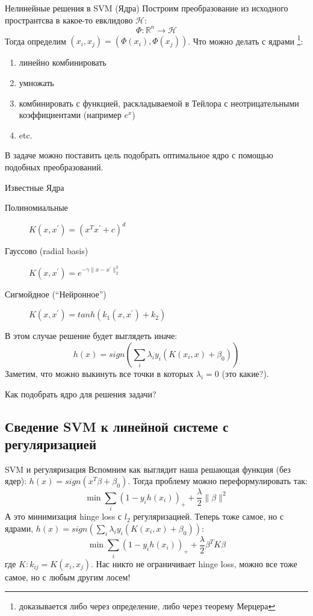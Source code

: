 \documentclass[14pt, fleqn, xcolor={dvipsnames, table}]{beamer}
\begin{document}
\begin{frame}{Нелинейные решения в SVM (Ядра)}
\small
Построим преобразование из исходного пространтсва в какое-то евклидово $\mathcal{H}$:
$$
\Phi: \mathbb{R}^n \to \mathcal{H}
$$
Тогда определим $(x_i, x_j) = (\Phi(x_i), \Phi(x_j))$. Что можно делать с ядрами \footnote{доказывается либо через определение, либо через теорему Мерцера}:
\begin{enumerate}
\footnotesize
  \item линейно комбинировать
  \item умножать
  \item комбинировать с функцией, раскладываемой в Тейлора с неотрицательными коэффициентами (например $e^x$)
  \item etc.
\end{enumerate}
В задаче можно поставить цель подобрать оптимальное ядро с помощью подобных преобразований.
\end{frame}

\begin{frame}{Известные Ядра}
\small
\begin{description}
  \item[Полиномиальные] $K(x,x^{'}) = (x^Tx^{'} + c)^d$ 
  \item[Гауссово (radial basis)] $K(x,x^{'}) = e^{-\gamma \|x - x^{'}\|_2^2}$ 
  \item[Сигмойдное (``Нейронное'')] $K(x,x^{'}) = tanh(k_1 (x,x^{'}) + k_2)$ 
\end{description}
В этом случае решение будет выглядеть иначе:
$$
h(x) = sign \left(\sum_i \lambda_i y_i (K(x_i, x) + \beta_0)\right)
$$
Заметим, что можно выкинуть все точки в которых $\lambda_i = 0$ (это какие?).
\end{frame}

\begin{frame}{Как подобрать ядро для решения задачи?}
\end{frame}

\subsection{Сведение SVM к линейной системе с регуляризацией} %

\begin{frame}{SVM и регуляризация}
\small
Вспомним как выглядит наша решающая функция (без ядер): $h(x) = sign(x^T \beta + \beta_0)$. Тогда проблему можно переформулировать так:
$$
\min \sum_i (1 - y_i h(x_i))_+ + \frac{\lambda}{2} \|\beta\|^2
$$
А это минимизация hinge loss с $l_2$ регуляризацией. Теперь тоже самое, но с ядрами, $h(x) = sign \left(\sum_i \lambda_i y_i (K(x_i, x) + \beta_0)\right)$:
$$
\min \sum_i (1 - y_i h(x_i))_+ + \frac{\lambda}{2} \beta^T K \beta
$$
где $K : k_{ij} = K(x_i, x_j)$. Нас никто не ограничивает hinge loss, можно все тоже самое, но с любым другим лосем!
\end{frame}
\end{document}
